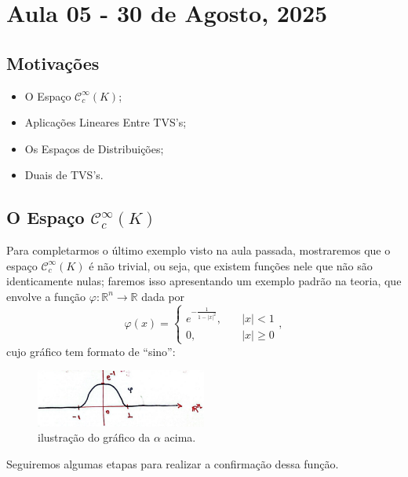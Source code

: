 \documentclass[../distribution_theory_notes.tex]{subfiles}
\begin{document}
\section{Aula 05 - 30 de Agosto, 2025}
\subsection{Motivações}
\begin{itemize}
 \item O Espaço \(\mathcal{C}_{c}^{\infty}(K)\);
 \item Aplicações Lineares Entre TVS's;
 \item Os Espaços de Distribuições;
 \item Duais de TVS's.
\end{itemize}
\subsection{O Espaço \(\mathcal{C}_{c}^{\infty}(K)\)}
  Para completarmos o último exemplo visto na aula passada, mostraremos que o espaço \(\mathcal{C}_{c}^{\infty}(K)\) é não trivial, ou seja, que existem funções nele que não são identicamente nulas; faremos isso apresentando um exemplo padrão na teoria, que envolve a função \(\varphi :\mathbb{R}^{n}\rightarrow \mathbb{R}\) dada por 
    \[
      \varphi(x) = \left\{\begin{array}{ll}
          e^{-\frac{1}{1-|x|^{2}}}, &\quad |x| < 1\\ 
          0, &\quad  |x|\geq 0
        \end{array}\right.,
    \]
    cujo gráfico tem formato de ``sino'': 
   \begin{figure}[H]
   \begin{center}
   \includegraphics[height=0.5\textheight, width=0.5\textwidth, keepaspectratio]{./Images/bell_curve_05.png}
   \end{center}
   \caption{ilustração do gráfico da \(\alpha \) acima.}
   \end{figure}

   Seguiremos algumas etapas para realizar a confirmação dessa função. 
\end{document}
